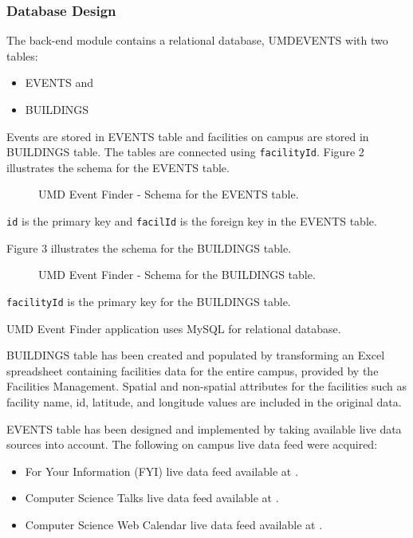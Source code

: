 \documentclass{acm_proc_article-sp}
\begin{document}
\subsubsection{Database Design}
The back-end module contains a relational database, UMDEVENTS with two tables:
\begin{itemize}
\item EVENTS and
\item BUILDINGS 
\end{itemize}

Events are stored in EVENTS table and facilities on campus are stored in BUILDINGS table. The tables are connected using \texttt{facilityId}. Figure 2 illustrates the schema for the EVENTS table. 

\begin{figure}
\centering
{}
\caption{UMD Event Finder - Schema for the EVENTS table.}
\end{figure}

\texttt{id} is the primary key and \texttt{facilId} is the foreign key in the EVENTS table. 

Figure 3 illustrates the schema for the BUILDINGS table. 

\begin{figure}
\centering
{}
\caption{UMD Event Finder - Schema for the BUILDINGS table.}
\end{figure}

\texttt{facilityId} is the primary key for the BUILDINGS table. 

UMD Event Finder application uses MySQL for relational database. 

BUILDINGS table has been created and populated by transforming an Excel spreadsheet containing facilities data for the entire campus, provided by the Facilities Management. Spatial and non-spatial attributes for the facilities such as facility name, id, latitude, and longitude values are included in the original data.

EVENTS table has been designed and implemented by taking available live data sources into account. The following on campus live data feed were acquired:
\begin{itemize}
\item For Your Information (FYI) live data feed available at \cite{fyi:xmlfeed}.
\item Computer Science Talks live data feed available at \cite{cs:talks}.
\item Computer Science Web Calendar live data feed available at \cite{cs:webcal}.
\end{itemize}
\end{document}
